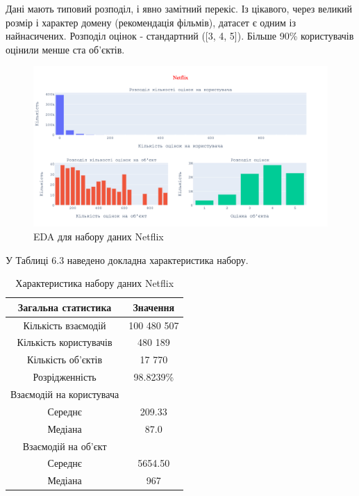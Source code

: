 Дані мають типовий розподіл, і явно замітний перекіс. Із цікавого, через великий розмір і характер домену (рекомендація фільмів), датасет є одним із найнасичених. Розподіл оцінок - стандартний ([3, 4, 5]). Більше 90\% користувачів оцінили менше ста об’єктів.
\begin{figure}[H]
    \centering
    \includegraphics[width = 1\textwidth]{images/netflix_stat.png}    
    \caption{EDA для набору даних Netflix}
\end{figure}
У Таблиці 6.3 наведено докладна характеристика набору.
\begin{table}[H]
    \centering
    \caption{Характеристика набору даних Netflix}
    \begin{tabular}{|c|c|}
        \hline
        Загальна статистика      & Значення \\ \hline
        Кількість взаємодій      & 100 480 507                  \\
        Кількість користувачів   & 480 189                        \\
        Кількість об’єктів       & 17 770                        \\
        Розрідженність           & 98.8239\%                    \\\hline
        Взаємодій на користувача &                              \\ \hline
        Середнє                  & 209.33                       \\
        Медіана                  & 87.0                         \\ \hline
        Взаємодій на об’єкт      &                              \\ \hline
        Середнє                  & 5654.50                       \\
        Медіана                  & 967                      \\ \hline
    \end{tabular}
    \label{tab:Netflix}
\end{table}

